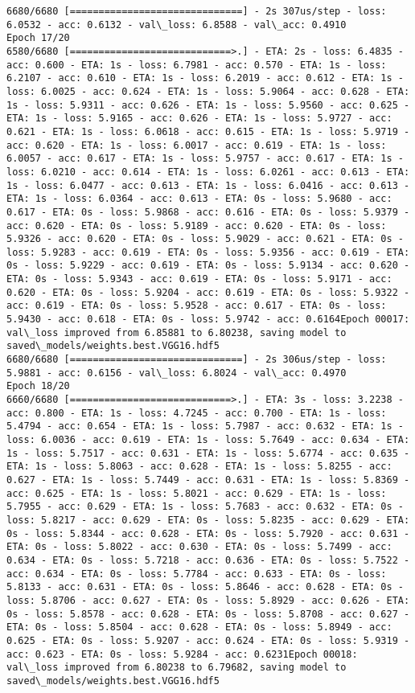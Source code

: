 \documentclass[11pt]{article}
\begin{document}
\begin{Verbatim}[commandchars=\\\{\}]
6680/6680 [==============================] - 2s 307us/step - loss: 6.0532 - acc: 0.6132 - val\_loss: 6.8588 - val\_acc: 0.4910
Epoch 17/20
6580/6680 [============================>.] - ETA: 2s - loss: 6.4835 - acc: 0.600 - ETA: 1s - loss: 6.7981 - acc: 0.570 - ETA: 1s - loss: 6.2107 - acc: 0.610 - ETA: 1s - loss: 6.2019 - acc: 0.612 - ETA: 1s - loss: 6.0025 - acc: 0.624 - ETA: 1s - loss: 5.9064 - acc: 0.628 - ETA: 1s - loss: 5.9311 - acc: 0.626 - ETA: 1s - loss: 5.9560 - acc: 0.625 - ETA: 1s - loss: 5.9165 - acc: 0.626 - ETA: 1s - loss: 5.9727 - acc: 0.621 - ETA: 1s - loss: 6.0618 - acc: 0.615 - ETA: 1s - loss: 5.9719 - acc: 0.620 - ETA: 1s - loss: 6.0017 - acc: 0.619 - ETA: 1s - loss: 6.0057 - acc: 0.617 - ETA: 1s - loss: 5.9757 - acc: 0.617 - ETA: 1s - loss: 6.0210 - acc: 0.614 - ETA: 1s - loss: 6.0261 - acc: 0.613 - ETA: 1s - loss: 6.0477 - acc: 0.613 - ETA: 1s - loss: 6.0416 - acc: 0.613 - ETA: 1s - loss: 6.0364 - acc: 0.613 - ETA: 0s - loss: 5.9680 - acc: 0.617 - ETA: 0s - loss: 5.9868 - acc: 0.616 - ETA: 0s - loss: 5.9379 - acc: 0.620 - ETA: 0s - loss: 5.9189 - acc: 0.620 - ETA: 0s - loss: 5.9326 - acc: 0.620 - ETA: 0s - loss: 5.9029 - acc: 0.621 - ETA: 0s - loss: 5.9283 - acc: 0.619 - ETA: 0s - loss: 5.9356 - acc: 0.619 - ETA: 0s - loss: 5.9229 - acc: 0.619 - ETA: 0s - loss: 5.9134 - acc: 0.620 - ETA: 0s - loss: 5.9343 - acc: 0.619 - ETA: 0s - loss: 5.9171 - acc: 0.620 - ETA: 0s - loss: 5.9204 - acc: 0.619 - ETA: 0s - loss: 5.9322 - acc: 0.619 - ETA: 0s - loss: 5.9528 - acc: 0.617 - ETA: 0s - loss: 5.9430 - acc: 0.618 - ETA: 0s - loss: 5.9742 - acc: 0.6164Epoch 00017: val\_loss improved from 6.85881 to 6.80238, saving model to saved\_models/weights.best.VGG16.hdf5
6680/6680 [==============================] - 2s 306us/step - loss: 5.9881 - acc: 0.6156 - val\_loss: 6.8024 - val\_acc: 0.4970
Epoch 18/20
6660/6680 [============================>.] - ETA: 3s - loss: 3.2238 - acc: 0.800 - ETA: 1s - loss: 4.7245 - acc: 0.700 - ETA: 1s - loss: 5.4794 - acc: 0.654 - ETA: 1s - loss: 5.7987 - acc: 0.632 - ETA: 1s - loss: 6.0036 - acc: 0.619 - ETA: 1s - loss: 5.7649 - acc: 0.634 - ETA: 1s - loss: 5.7517 - acc: 0.631 - ETA: 1s - loss: 5.6774 - acc: 0.635 - ETA: 1s - loss: 5.8063 - acc: 0.628 - ETA: 1s - loss: 5.8255 - acc: 0.627 - ETA: 1s - loss: 5.7449 - acc: 0.631 - ETA: 1s - loss: 5.8369 - acc: 0.625 - ETA: 1s - loss: 5.8021 - acc: 0.629 - ETA: 1s - loss: 5.7955 - acc: 0.629 - ETA: 1s - loss: 5.7683 - acc: 0.632 - ETA: 0s - loss: 5.8217 - acc: 0.629 - ETA: 0s - loss: 5.8235 - acc: 0.629 - ETA: 0s - loss: 5.8344 - acc: 0.628 - ETA: 0s - loss: 5.7920 - acc: 0.631 - ETA: 0s - loss: 5.8022 - acc: 0.630 - ETA: 0s - loss: 5.7499 - acc: 0.634 - ETA: 0s - loss: 5.7218 - acc: 0.636 - ETA: 0s - loss: 5.7522 - acc: 0.634 - ETA: 0s - loss: 5.7784 - acc: 0.633 - ETA: 0s - loss: 5.8133 - acc: 0.631 - ETA: 0s - loss: 5.8646 - acc: 0.628 - ETA: 0s - loss: 5.8706 - acc: 0.627 - ETA: 0s - loss: 5.8929 - acc: 0.626 - ETA: 0s - loss: 5.8578 - acc: 0.628 - ETA: 0s - loss: 5.8708 - acc: 0.627 - ETA: 0s - loss: 5.8504 - acc: 0.628 - ETA: 0s - loss: 5.8949 - acc: 0.625 - ETA: 0s - loss: 5.9207 - acc: 0.624 - ETA: 0s - loss: 5.9319 - acc: 0.623 - ETA: 0s - loss: 5.9284 - acc: 0.6231Epoch 00018: val\_loss improved from 6.80238 to 6.79682, saving model to saved\_models/weights.best.VGG16.hdf5

\end{Verbatim}
\end{document}
